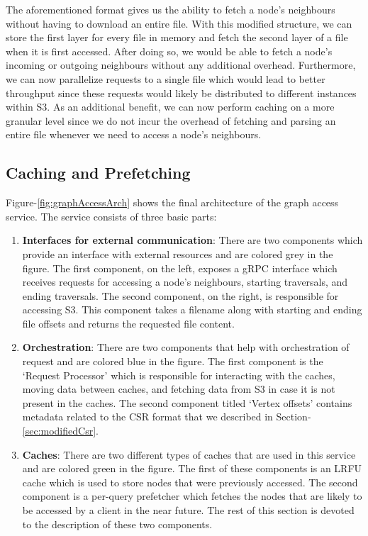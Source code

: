 \medskip
The aforementioned format gives us the ability to fetch a node's neighbours
without having to download an entire file. With this modified structure, we can
store the first layer for every file in memory and fetch the second layer of a
file when it is first accessed. After doing so, we would be able to fetch a
node's incoming or outgoing neighbours without any additional overhead.
Furthermore, we can now parallelize requests to a single file which would lead
to better throughput since these requests would likely be distributed to
different instances within S3. As an additional benefit, we can now perform
caching on a more granular level since we do not incur the overhead of fetching
and parsing an entire file whenever we need to access a node's neighbours.

\subsection{Caching and Prefetching}\label{sec:accessCachePrefetching}
Figure-\ref{fig:graphAccessArch} shows the final architecture of the graph
access service. The service consists of three basic parts:
\begin{enumerate}
    \item \textbf{Interfaces for external communication}: There are two 
        components which provide an interface with external resources and are
        colored grey in the figure. The first component, on the left,
        exposes a gRPC interface which receives requests for accessing a node's
        neighbours, starting traversals, and ending traversals. The second
        component, on the right, is responsible for accessing S3. This component
        takes a filename along with starting and ending file offsets and returns
        the requested file content.
    \item \textbf{Orchestration}: There are two components that help with
        orchestration of request and are colored blue in the figure. The first
        component is the `Request Processor' which is responsible for
        interacting with the caches, moving data between caches, and fetching
        data from S3 in case it is not present in the caches. The second
        component titled `Vertex offsets' contains metadata related to the CSR
        format that we described in Section-\ref{sec:modifiedCsr}.
    \item \textbf{Caches}: There are two different types of caches that are used
        in this service and are colored green in the figure. The first of these
        components is an LRFU cache which is used to store nodes that were
        previously accessed. The second component is a per-query prefetcher
        which fetches the nodes that are likely to be accessed by a client in
        the near future. The rest of this section is devoted to the description
        of these two components.
\end{enumerate}
